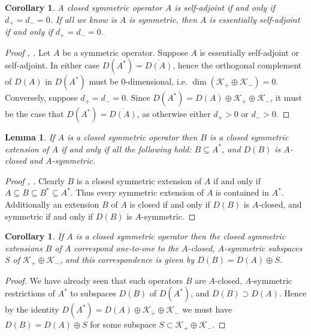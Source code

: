 \documentclass[12pt,oneside]{report}
\newtheorem{cor}[thm]{Corollary}
\newtheorem{lem}[thm]{Lemma}
\begin{document}
\begin{cor}
    A closed symmetric operator $A$ is self-adjoint if and only if $d_{+} = d_{-} = 0$. If all we know is $A$ is symmetric, then $A$ is essentially self-adjoint if and only if $d_{+} = d_{-} = 0$.
\end{cor}
\begin{proof}[Proof \cite{simon_classical_1998}, \cite{Reed_Simon_1975}]
    Let $A$ be a symmetric operator. Suppose $A$ is essentially self-adjoint or self-adjoint. In either case $D(A^{*}) = \overline{D(A)}$, hence the orthogonal complement of $D(A)$ in $D(A^{*})$ must be $0$-dimensional, i.e. $\dim(\mathscr{K}_{+} \oplus \mathscr{K}_{-}) = 0$. Conversely, suppose $d_{+} = d_{-} = 0$. Since $D(A^{*}) = D(A) \oplus \mathscr{K}_{+} \oplus \mathscr{K}_{-}$, it must be the case that $D(A^{*}) = \overline{D(A)}$, as otherwise either $d_{+} > 0$ or $d_{-} > 0$.
\end{proof}

\begin{lem}
    If $A$ is a closed symmetric operator then $B$ is a closed symmetric extension of $A$ if and only if all the following hold: $B \subseteq A^{*}$, and $D(B)$ is $A$-closed and $A$-symmetric.
\end{lem}
\begin{proof}[Proof \cite{simon_classical_1998}, \cite{Reed_Simon_1975}]
    Clearly $B$ is a closed symmetric extension of $A$ if and only if $A \subseteq B \subseteq B^{*} \subseteq A^{*}$. Thus every symmetric extension of $A$ is contained in $A^{*}$. Additionally an extension $B$ of $A$ is closed if and only if $D(B)$ is $A$-closed, and symmetric if and only if $D(B)$ is $A$-symmetric.
\end{proof}

\begin{cor}\label{Aclosed-Asymm}
    If $A$ is a closed symmetric operator then the closed symmetric extensions $B$ of $A$ correspond one-to-one to the $A$-closed, $A$-symmetric subspaces $S$ of $\mathscr{K}_{+} \oplus \mathscr{K}_{-}$, and this correspondence is given by $D(B) = D(A) \oplus S$.
\end{cor}
\begin{proof}
    We have already seen that such operators $B$ are $A$-closed, $A$-symmetric restrictions of $A^{*}$ to subspaces $D(B)$ of $D(A^{*})$, and $D(B) \supset D(A)$. Hence by the identity $D(A^{*}) = D(A) \oplus \mathscr{K}_{+} \oplus \mathscr{K}_{-}$ we must have $D(B) = D(A) \oplus S$ for some subspace $S \subset \mathscr{K}_{+} \oplus \mathscr{K}_{-}$.
\end{proof}
\end{document}
